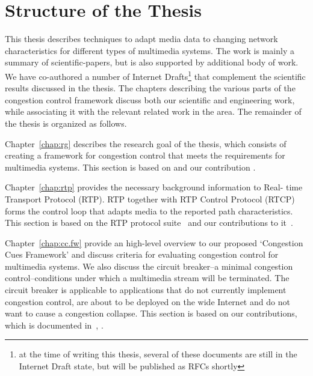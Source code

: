 \section{Structure of the Thesis}

This thesis describes techniques to adapt media data to changing network
characteristics for different types of multimedia systems. The work is mainly
a summary of scientific-papers, but is also supported by additional body of
work. We have co-authored a number of Internet Drafts\footnote{at the time of
writing this thesis, several of these documents are still in the Internet
Draft state, but will be published as RFCs shortly} that complement the
scientific results discussed in the thesis. The chapters describing the
various parts of the congestion control framework discuss both our scientific
and engineering work, while associating it with the relevant related work in
the area. The remainder of the thesis is organized as follows.

Chapter~\ref{chap:rg} describes the research goal of the thesis, which
consists of creating a framework for congestion control that meets the
requirements for multimedia systems. This section is based on
\cite{draft.rmcat.req} and our contribution \cite{Singh:control.loops.api}.


Chapter~\ref{chap:rtp} provides the necessary background information to Real-
time Transport Protocol (RTP). RTP together with RTP Control Protocol (RTCP)
forms the control loop that adapts media to the reported path characteristics.
This section is based on the RTP protocol suite~\cite{rfc3550, rfc4585,
rfc3611, rfc5104, rfc5506} and our contributions to
it~\cite{draft.xr.discard.rle, draft.xr.jb}.


Chapter~\ref{chap:cc.fw} provide an high-level overview to our proposed
`Congestion Cues Framework' and discuss criteria for evaluating congestion
control for multimedia systems. We also discuss the circuit breaker--a minimal
congestion control--conditions under which a multimedia stream will be
terminated. The circuit breaker is applicable to applications that do not
currently implement congestion control, are about to be deployed on the wide
Internet and do not want to cause a congestion collapse. This section is based
on our contributions, which is documented in~\cite{draft.rmcat.evaluate,
Singh:PhDFw, draft.rtp.cb}, .


